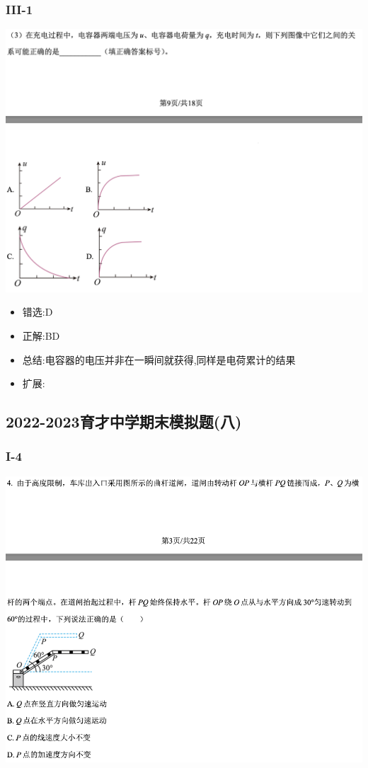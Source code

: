 \documentclass{article}
\begin{document}
    \subsubsection{III-1}
    \includegraphics[width=50em,keepaspectratio]{./pictures/1.1-4.png}

    \begin{itemize}
        \item 错选:\quad D
        \item 正解:\quad BD
        \item 总结:\quad 电容器的电压并非在一瞬间就获得,同样是电荷累计的结果
        \item 扩展:\quad
    \end{itemize}


    \subsection{2022-2023育才中学期末模拟题(八)}

    \subsubsection{I-4}
    \includegraphics[width=50em,keepaspectratio]{./pictures/1.2-1.png}
\end{document}
